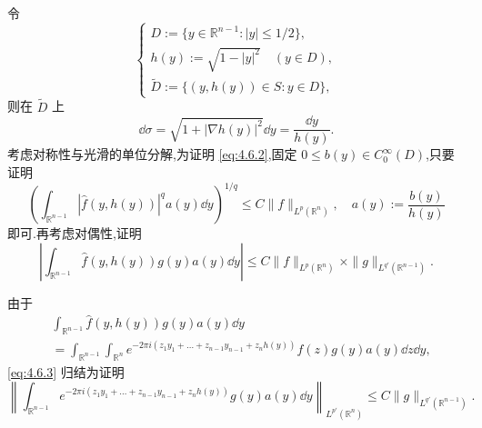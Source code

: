 令
\begin{equation*}
\begin{cases}
D := \{y \in \mathbb{R}^{n-1}: |y| \leq 1/2\}, \\
h(y) := \sqrt{1 - |y|^{2}} \quad (y \in D), \\
\tilde{D} := \{(y, h(y)) \in S: y \in D\},
\end{cases}
\end{equation*}
则在 $\tilde{D}$ 上
\begin{equation*}
\dd\sigma = \sqrt{1 + |\nabla h(y)|^{2}}\dd y = \frac{\dd y}{h(y)}.
\end{equation*}
考虑对称性与光滑的单位分解,为证明 \eqref{eq:4.6.2},固定 $0 \leq b(y) \in C_{0}^{\infty}(D)$,只要证明
\begin{equation*}
\left(\int_{\mathbb{R}^{n-1}}|\hat{f}(y, h(y))|^{q}a(y)\dd y\right)^{1/q} \leq C\|f\|_{L^{p}(\mathbb{R}^{n})}, \quad a(y) := \frac{b(y)}{h(y)}
\end{equation*}
即可.再考虑对偶性,证明
\begin{equation}
\left|\int_{\mathbb{R}^{n-1}}\hat{f}(y, h(y))g(y)a(y)\dd y\right| \leq C\|f\|_{L^{p}(\mathbb{R}^{n})}\times\|g\|_{L^{q'}(\mathbb{R}^{n-1})}.\tag{4.6.3}
\label{eq:4.6.3}\end{equation}

由于
\begin{equation}
\begin{aligned}
& \int_{\mathbb{R}^{n-1}}\hat{f}(y, h(y))g(y)a(y)\dd y \\
& = \int_{\mathbb{R}^{n-1}}\int_{\mathbb{R}^{n}}e^{-2\pi i(z_{1}y_{1} + \ldots + z_{n-1}y_{n-1} + z_{n}h(y))}f(z)g(y)a(y)\dd z\dd y,
\end{aligned}
\end{equation}
\eqref{eq:4.6.3} 归结为证明
\begin{equation}
\left\|\int_{\mathbb{R}^{n-1}}e^{-2\pi i(z_{1}y_{1} + \ldots + z_{n-1}y_{n-1} + z_{n}h(y))}g(y)a(y)\dd y\right\|_{L^{p'}(\mathbb{R}^{n})} \leq C\|g\|_{L^{q'}(\mathbb{R}^{n-1})}.\tag{4.6.4}
\label{eq:4.6.4}\end{equation}

